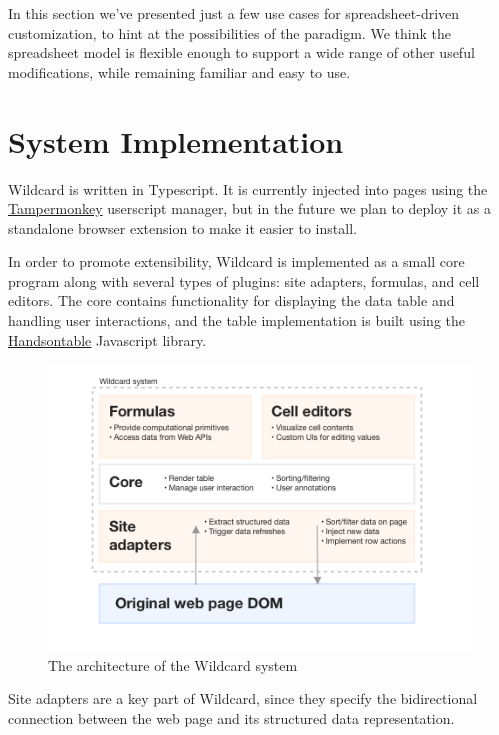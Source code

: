 \documentclass[english,submission]{programming}
\begin{document}
In this section we've presented just a few use cases for
spreadsheet-driven customization, to hint at the possibilities of the
paradigm. We think the spreadsheet model is flexible enough to support a
wide range of other useful modifications, while remaining familiar and
easy to use.

\hypertarget{sec:implementation}{%
\section{System Implementation}\label{sec:implementation}}

Wildcard is written in Typescript. It is currently injected into pages
using the \href{https://www.tampermonkey.net/}{Tampermonkey} userscript
manager, but in the future we plan to deploy it as a standalone browser
extension to make it easier to install.

In order to promote extensibility, Wildcard is implemented as a small
core program along with several types of plugins: site adapters,
formulas, and cell editors. The core contains functionality for
displaying the data table and handling user interactions, and the table
implementation is built using the
\href{https://handsontable.com/}{Handsontable} Javascript library.

\begin{figure}
\hypertarget{fig:architecture}{%
\centering
\includegraphics{media/architecture-clean.png}
\caption{The architecture of the Wildcard
system}\label{fig:architecture}
}
\end{figure}

Site adapters are a key part of Wildcard, since they specify the
bidirectional connection between the web page and its structured data
representation.
\end{document}
